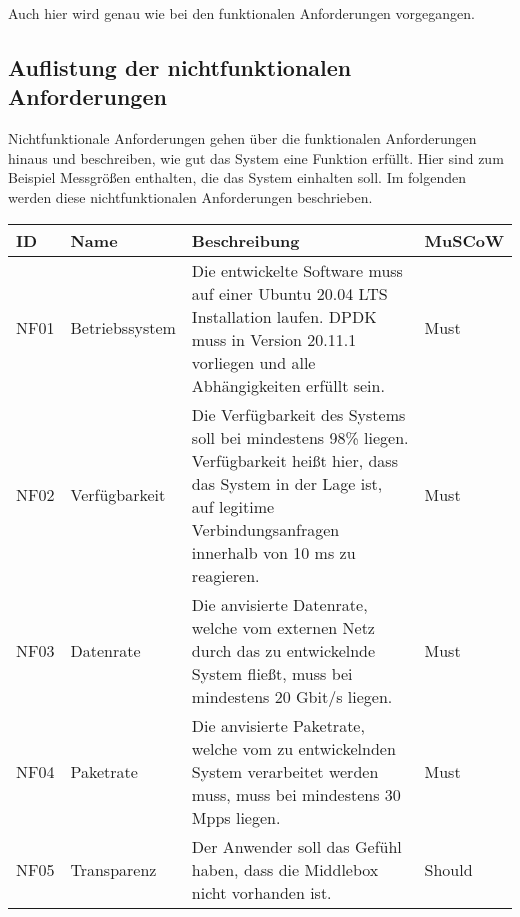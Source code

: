 \documentclass[../review_3.tex]{subfiles}
\begin{document}
Auch hier wird genau wie bei den funktionalen Anforderungen vorgegangen.

\subsection{Auflistung der nichtfunktionalen Anforderungen}

Nichtfunktionale Anforderungen gehen über die funktionalen Anforderungen hinaus und beschreiben, wie gut das System eine Funktion erfüllt. Hier sind zum Beispiel Messgrößen enthalten, die das System einhalten soll. Im folgenden werden diese nichtfunktionalen Anforderungen beschrieben.

\begin{longtable}[ht] { p{1cm} p{4cm} p{7cm} l }
    \toprule
    \textbf{ID} & \textbf{Name}        & \textbf{Beschreibung}                                                                                                                                                                                                                    & \textbf{MuSCoW} \\ \midrule \endhead
    NF01        & Betriebssystem       & Die entwickelte Software muss auf einer Ubuntu 20.04 LTS Installation laufen. DPDK muss in Version 20.11.1 vorliegen und alle Abhängigkeiten erfüllt sein.                                                                               & Must            \\
    NF02        & Verfügbarkeit        & Die Verfügbarkeit des Systems soll bei mindestens 98\% liegen. Verfügbarkeit heißt hier, dass das System in der Lage ist, auf legitime Verbindungsanfragen innerhalb von 10 ms zu reagieren.                                             & Must            \\
    NF03        & Datenrate            & Die anvisierte Datenrate, welche vom externen Netz durch das zu entwickelnde System fließt, muss bei mindestens 20 Gbit/s liegen.                                                                                                        & Must            \\
    NF04        & Paketrate            & Die anvisierte Paketrate, welche vom zu entwickelnden System verarbeitet werden muss, muss bei mindestens 30 Mpps liegen.                                                                                                                & Must            \\
    NF05        & Transparenz          & Der Anwender soll das Gefühl haben, dass die Middlebox nicht vorhanden ist.                                                                                                                                                              & Should          \\

\end{longtable}
\end{document}
